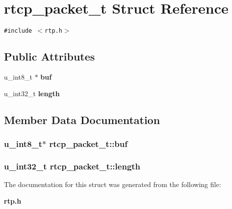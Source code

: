 \section{rtcp\_\-packet\_\-t Struct Reference}
\label{structrtcp__packet__t}
{\tt \#include $<$rtp.h$>$}

\subsection*{Public Attributes}
\begin{CompactItemize}
\item 
u\_\-int8\_\-t $\ast$ {\bf buf}
\item 
u\_\-int32\_\-t {\bf length}
\end{CompactItemize}


\subsection{Member Data Documentation}
\subsubsection{\setlength{\rightskip}{0pt plus 5cm}u\_\-int8\_\-t$\ast$ {\bf rtcp\_\-packet\_\-t::buf}}\label{structrtcp__packet__t_o0}


\subsubsection{\setlength{\rightskip}{0pt plus 5cm}u\_\-int32\_\-t {\bf rtcp\_\-packet\_\-t::length}}\label{structrtcp__packet__t_o1}




The documentation for this struct was generated from the following file:\begin{CompactItemize}
\item 
{\bf rtp.h}\end{CompactItemize}

